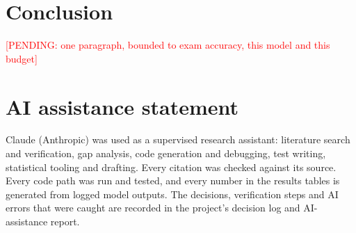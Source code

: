 \IfFileExists{IEEEtran.cls}{\documentclass[conference]{IEEEtran}}{\documentclass[10pt,twocolumn]{article}\usepackage[margin=0.75in]{geometry}}
\newcommand{\pending}[1]{\textcolor{red}{[PENDING: #1]}}
\begin{document}
\section{Conclusion}
\pending{one paragraph, bounded to exam accuracy, this model and this budget}

\section*{AI assistance statement}
Claude (Anthropic) was used as a supervised research assistant: literature search and verification, gap analysis, code generation and debugging, test writing, statistical tooling and drafting. Every citation was checked against its source. Every code path was run and tested, and every number in the results tables is generated from logged model outputs. The decisions, verification steps and AI errors that were caught are recorded in the project's decision log and AI-assistance report.


\end{document}
